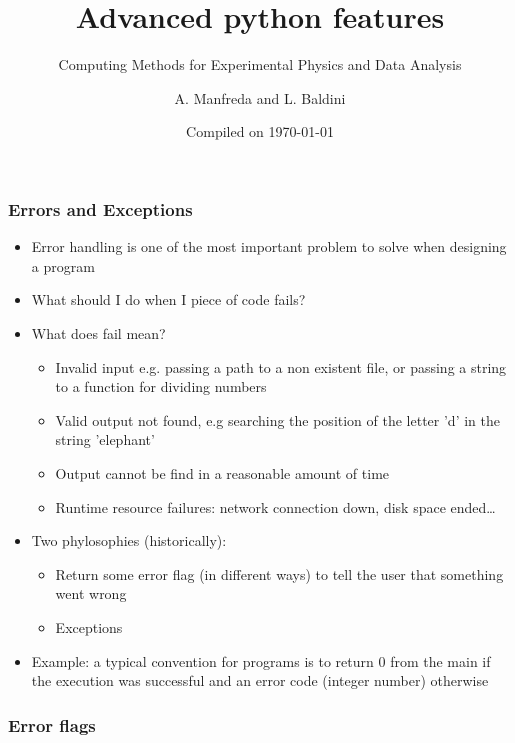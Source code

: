 \documentclass[9pt]{beamer}
\title{Advanced python features}
\subtitle{Computing Methods for Experimental Physics and Data Analysis}
\date{Compiled on \today}
\author{A. Manfreda and L. Baldini}
\institute[INFN]{INFN--Pisa}
\begin{document}
\titleframe

\begin{frame}
  \frametitle{Errors and Exceptions}
  \begin{itemize}
    \item \alert{Error handling} is one of the most important problem to solve when designing a program
    \item What should I do when I piece of code fails?
    \item What does fail mean?
    \begin {itemize}
      \item Invalid input e.g. passing a path to a non existent file, or passing a string to a function for dividing numbers
      \item Valid output not found, e.g searching the position of the letter 'd' in the string 'elephant'
      \item Output cannot be find in a reasonable amount of time
      \item Runtime resource failures: network connection down, disk space ended\dots
    \end{itemize}
    \item Two phylosophies (historically):
    \begin{itemize}
      \item Return some \alert{error flag} (in different ways) to tell the user that something went wrong
      \item \alert{Exceptions}
    \end{itemize}
    \item Example: a typical convention for programs is to return 0 from the main if the execution was successful and an
          error code (integer number) otherwise
  \end{itemize}
\end{frame}


\begin{frame}
  \frametitle{Error flags}
  
\end{frame}
\end{document}
